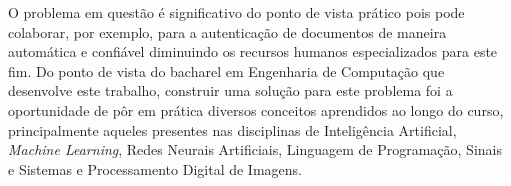 O problema em questão é significativo do ponto de vista prático pois pode colaborar, por exemplo, para a autenticação de documentos de maneira automática e confiável diminuindo os recursos humanos especializados para este fim. Do ponto de vista do bacharel em Engenharia de Computação que desenvolve este trabalho, construir uma solução para este problema foi a oportunidade de pôr em prática diversos conceitos aprendidos ao longo do curso, principalmente aqueles presentes nas disciplinas de Inteligência Artificial, \emph{Machine Learning}, Redes Neurais Artificiais, Linguagem de Programação, Sinais e Sistemas e Processamento Digital de Imagens.
